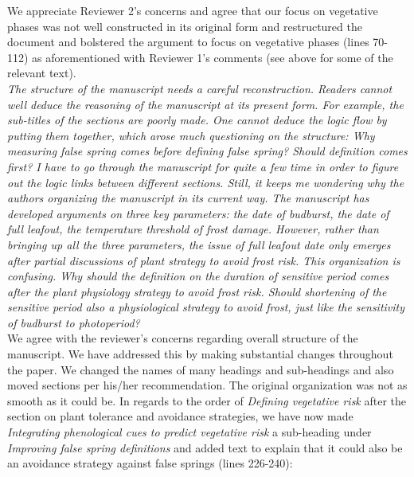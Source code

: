 \documentclass[11pt,a4paper]{article}
\begin{document}
We appreciate Reviewer 2's concerns and agree that our focus on vegetative phases was not well constructed in its original form and restructured the document and bolstered the argument to focus on vegetative phases (lines 70-112) as aforementioned with Reviewer 1's comments (see above for some of the relevant text).\\


\textit{The structure of the manuscript needs a careful reconstruction. Readers cannot well deduce the reasoning of the manuscript at its present form. For example, the sub-titles of the sections are poorly made. One cannot deduce the logic flow by putting them together, which arose much questioning on the structure: Why measuring false spring comes before defining false spring? Should definition comes first? I have to go through the manuscript for quite a few time in order to figure out the logic links between different sections. Still, it keeps me wondering why the authors organizing the manuscript in its current way. The manuscript has developed arguments on three key parameters: the date of budburst, the date of full leafout, the temperature threshold of frost damage. However, rather than bringing up all the three parameters, the issue of full leafout date only emerges after partial discussions of plant strategy to avoid frost risk. This organization is confusing. Why should the definition on the duration of sensitive period comes after the plant physiology strategy to avoid frost risk. Should shortening of the sensitive period also a physiological strategy to avoid frost, just like the sensitivity of budburst to photoperiod? } \\

We agree with the reviewer's concerns regarding overall structure of the manuscript. We have addressed this by making substantial changes throughout the paper. We changed the names of many headings and sub-headings and also moved sections per his/her recommendation. The original organization was not as smooth as it could be. In regards to the order of \textit{Defining vegetative risk} after the section on plant tolerance and avoidance strategies, we have now made \textit{Integrating phenological cues to predict vegetative risk} a sub-heading under \textit{Improving false spring definitions} and added text to explain that it could also be an avoidance strategy against false springs (lines 226-240): \\
\end{document}
